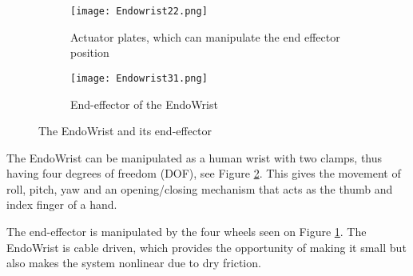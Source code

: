 \begin{figure}
  \centering
  \begin{subfigure}{.22\textwidth}
    \centering
    \texttt{[image: Endowrist22.png]}
    \caption{Actuator plates, which can manipulate the end effector position}
    \label{fig:Endo_plates}
  \end{subfigure}
  \begin{subfigure}{.22\textwidth}
    \centering
    \texttt{[image: Endowrist31.png]}
    \caption{End-effector of the EndoWrist\newline}
    \label{fig:Endo_end}
  \end{subfigure}
\caption{The EndoWrist and its end-effector}
\label{fig:endowrits_set}
\end{figure}


The EndoWrist can be manipulated as a human wrist with two clamps, thus having four degrees of freedom (DOF), see Figure \ref{fig:Endo_end}. This gives the movement of roll, pitch, yaw and an opening/closing mechanism that acts as the thumb and index finger of a hand.


The end-effector is manipulated by the four wheels seen on Figure \ref{fig:Endo_plates}. The EndoWrist is cable driven, which provides the opportunity of making it small but also makes the system nonlinear due to dry friction.





